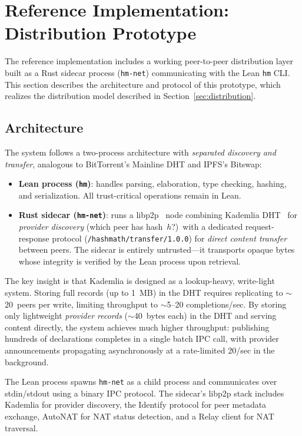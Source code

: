\documentclass[11pt]{article}
\theoremstyle{definition}
\theoremstyle{plain}
\theoremstyle{remark}
\begin{document}
\section{Reference Implementation: Distribution Prototype}
\label{sec:prototype}

The reference implementation includes a working peer-to-peer distribution layer
built as a Rust sidecar process (\texttt{hm-net}) communicating with the Lean
\texttt{hm} CLI.
This section describes the architecture and protocol of this prototype,
which realizes the distribution model described in Section~\ref{sec:distribution}.

\subsection{Architecture}

The system follows a two-process architecture with \emph{separated discovery
and transfer}, analogous to BitTorrent's Mainline DHT and IPFS's Bitswap:
\begin{itemize}[nosep]
  \item \textbf{Lean process (\texttt{hm})}: handles parsing, elaboration,
    type checking, hashing, and serialization.
    All trust-critical operations remain in Lean.
  \item \textbf{Rust sidecar (\texttt{hm-net})}: runs a libp2p~\cite{libp2p}
    node combining Kademlia DHT~\cite{maymounkov2002kademlia} for
    \emph{provider discovery} (which peer has hash~$h$?)\ with a dedicated
    request-response protocol (\texttt{/hashmath/transfer/1.0.0}) for
    \emph{direct content transfer} between peers.
    The sidecar is entirely untrusted---it transports opaque bytes
    whose integrity is verified by the Lean process upon retrieval.
\end{itemize}

The key insight is that Kademlia is designed as a lookup-heavy, write-light
system.
Storing full records (up to 1~MB) in the DHT requires replicating to
$\sim$20~peers per write, limiting throughput to $\sim$5--20 completions/sec.
By storing only lightweight \emph{provider records} ($\sim$40~bytes each)
in the DHT and serving content directly, the system achieves much higher
throughput: publishing hundreds of declarations completes in a single batch
IPC call, with provider announcements propagating asynchronously at a
rate-limited 20/sec in the background.

The Lean process spawns \texttt{hm-net} as a child process and communicates
over stdin/stdout using a binary IPC protocol.
The sidecar's libp2p stack includes Kademlia for provider discovery, the
Identify protocol for peer metadata exchange, AutoNAT for NAT status detection,
and a Relay client for NAT traversal.
\end{document}
